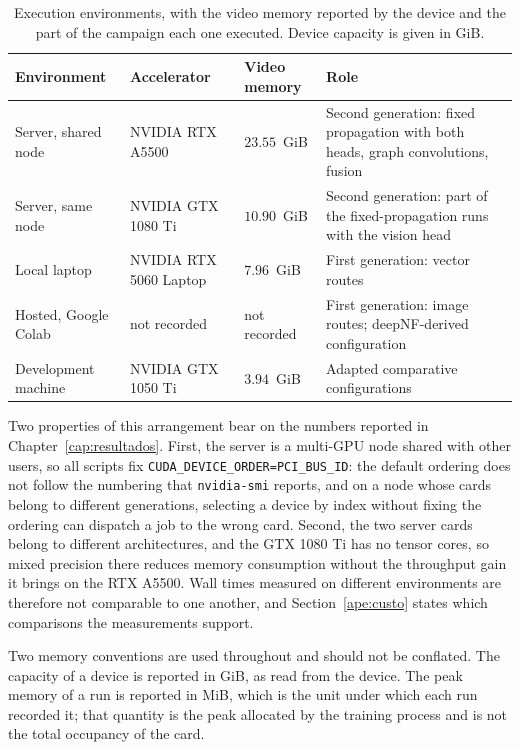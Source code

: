 \documentclass[Ingles]{ic-tese-v3}
\begin{document}
\begin{appendices}{}
\begin{table}[!htb]
  \centering
  \small
  \caption{Execution environments, with the video memory reported by the device and the part of the
  campaign each one executed. Device capacity is given in GiB.}
  \label{tab:ape_maquinas}
  \begin{tabular}{p{2.6cm}p{3.2cm}p{1.6cm}p{4.4cm}}
    \hline
    \textbf{Environment} & \textbf{Accelerator} & \textbf{Video memory} & \textbf{Role} \\
    \hline
    Server, shared node & NVIDIA RTX A5500 & $23.55$~GiB &
      Second generation: fixed propagation with both heads, graph convolutions, fusion \\[2pt]
    Server, same node & NVIDIA GTX 1080 Ti & $10.90$~GiB &
      Second generation: part of the fixed-propagation runs with the vision head \\[2pt]
    Local laptop & NVIDIA RTX 5060 Laptop & $7.96$~GiB &
      First generation: vector routes \\[2pt]
    Hosted, Google Colab & not recorded & not recorded &
      First generation: image routes; deepNF-derived configuration \\[2pt]
    Development machine & NVIDIA GTX 1050 Ti & $3.94$~GiB &
      Adapted comparative configurations \\
    \hline
  \end{tabular}
\end{table}

Two properties of this arrangement bear on the numbers reported in
Chapter~\ref{cap:resultados}. First, the server is a multi-GPU node shared with other users, so all
scripts fix \texttt{CUDA\_DEVICE\_ORDER=PCI\_BUS\_ID}: the default ordering does not follow the
numbering that \texttt{nvidia-smi} reports, and on a node whose cards belong to different
generations, selecting a device by index without fixing the ordering can dispatch a job to the wrong
card. Second, the two server cards belong to different architectures, and the GTX 1080 Ti has no
tensor cores, so mixed precision there reduces memory consumption without the throughput gain it
brings on the RTX A5500. Wall times measured on different environments are therefore not comparable
to one another, and Section~\ref{ape:custo} states which comparisons the measurements support.

Two memory conventions are used throughout and should not be conflated. The capacity of a device is
reported in GiB, as read from the device. The peak memory of a run is reported in MiB, which is the
unit under which each run recorded it; that quantity is the peak allocated by the training process
and is not the total occupancy of the card.


\end{appendices}
\end{document}
